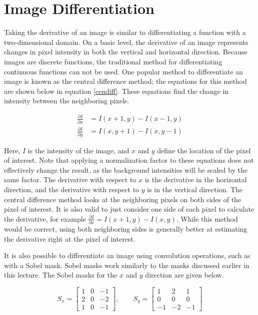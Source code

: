 \documentclass[twoside]{article}
\begin{document}
\section{Image Differentiation}
Taking the derivative of an image is similar to differentiating a function with a two-dimensional domain. On a basic level, the derivative of an image represents changes in pixel intensity in both the vertical and horizontal direction. Because images are discrete functions, the traditional method for differentiating continuous functions can not be used. One popular method to differentiate an image is known as the central difference method; the equations for this method are shown below in equation \ref{cendiff}. These equations find the change in intensity between the neighboring pixels.

\begin{equation}
  \label{cendiff}
  \begin{aligned}
    \frac{\partial I} {\partial x} &= I(x+1,y) - I(x-1,y)\\
    \frac{\partial I} {\partial y} &= I(x,y+1) - I(x,y-1)
  \end{aligned}
\end{equation}

Here, $I$ is the intensity of the image, and $x$ and $y$ define the location of the pixel of interest. Note that applying a normalization factor to these equations does not effectively change the result, as the background intensities will be scaled by the same factor. The derivative with respect to $x$ is the derivative in the horizontal direction, and the derivative with respect to $y$ is in the vertical direction. The central difference method looks at the neighboring pixels on both sides of the pixel of interest. It is also valid to just consider one side of each pixel to calculate the derivative, for example $\frac{\partial I}{\partial x} = I(x+1,y) - I(x,y)$. While this method would be correct, using both neighboring sides is generally better at estimating the derivative right at the pixel of interest.

It is also possible to differentiate an image using convolution operations, such as with a Sobel mask.  Sobel masks work similarly to the masks discussed earlier in this lecture. The Sobel masks for the $x$ and $y$ direction are given below.

\[
S_x =
\begin{bmatrix}
1 & 0 & -1\\
2 & 0 & -2\\
1 & 0 & -1
\end{bmatrix}
, \qquad S_y =
\begin{bmatrix}
1 & 2 & 1\\
0 & 0 & 0\\
-1 & -2 & -1
\end{bmatrix}
\]
\end{document}
